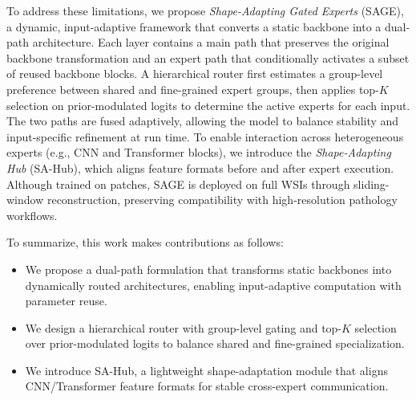 To address these limitations, we propose \textit{Shape-Adapting Gated Experts} (SAGE), a dynamic, input-adaptive framework that converts a static backbone into a dual-path architecture. Each layer contains a main path that preserves the original backbone transformation and an expert path that conditionally activates a subset of reused backbone blocks. A hierarchical router first estimates a group-level preference between shared and fine-grained expert groups, then applies top-$K$ selection on prior-modulated logits to determine the active experts for each input. The two paths are fused adaptively, allowing the model to balance stability and input-specific refinement at run time. To enable interaction across heterogeneous experts (e.g., CNN and Transformer blocks), we introduce the \textit{Shape-Adapting Hub} (SA-Hub), which aligns feature formats before and after expert execution. Although trained on patches, SAGE is deployed on full WSIs through sliding-window reconstruction, preserving compatibility with high-resolution pathology workflows.

To summarize, this work makes contributions as follows:
\begin{itemize}
\item We propose a dual-path formulation that transforms static backbones into dynamically routed architectures, enabling input-adaptive computation with parameter reuse.
\item We design a hierarchical router with group-level gating and top-$K$ selection over prior-modulated logits to balance shared and fine-grained specialization.
\item We introduce SA-Hub, a lightweight shape-adaptation module that aligns CNN/Transformer feature formats for stable cross-expert communication.
\end{itemize}
